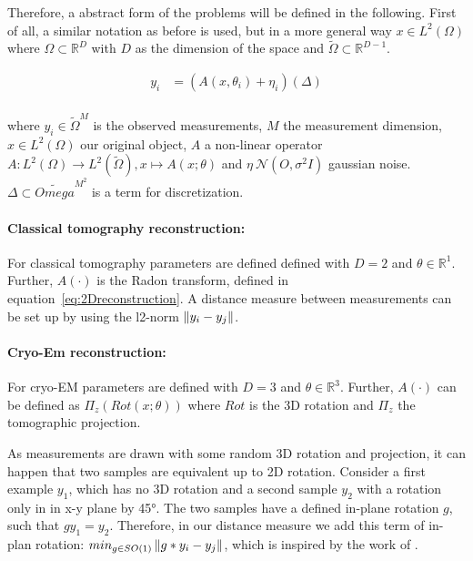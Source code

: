 Therefore, a abstract form of the problems will be defined in the following.
First of all, a similar notation as before is used, but in a more general way
$x \in L^2(\Omega)$ where $\Omega \subset \mathbb{R}^D$ with $D$ as the dimension of the space
and $\tilde{\Omega} \subset \mathbb{R}^{D-1}$.


\begin{equation}
    \begin{aligned}
        y_i &= \left( A(x, \theta_i) + \eta_i \right) (\Delta)\\
    \end{aligned}
\end{equation}

where $y_i \in \tilde{\Omega}^M$ is the observed measurements, $M$ the measurement dimension, $x \in L^2(\Omega)$ our original object, $A$ a non-linear operator 
$A: L^2(\Omega) \to L^2(\tilde{\Omega}), x \mapsto A(x; \theta)$ and
$\eta ~ \mathcal{N}(O, \sigma^2 I)$ gaussian noise. $\Delta \subset \tilde{Omega}^{M^2}$ is a term for discretization.

\paragraph{Classical tomography reconstruction:}

For classical tomography parameters are defined defined with $D=2$ and $\theta \in \mathbb{R}^1$.
Further, $A(\cdot)$ is the Radon transform, defined in equation~\ref{eq:2Dreconstruction}.
A distance measure between measurements can be set up by using the l2-norm $\left\lVert y_i - y_j\right\rVert$.

\paragraph{Cryo-Em reconstruction:}
For cryo-EM parameters are defined with $D=3$ and $\theta \in \mathbb{R}^3$.
Further, $A(\cdot)$ can be defined as $\Pi_z \left( Rot(x; \theta) \right)$ 
where $Rot$ is the 3D rotation and $\Pi_z$ the tomographic projection.

As measurements are drawn with some random 3D rotation and projection, it can happen that two samples are equivalent up to 2D rotation. 
Consider a first example $y_1$, which has no 3D rotation and 
a second sample $y_2$ with a rotation only in in x-y plane by 45°.
The two samples have a defined in-plane rotation $g$, such that $g y_1 = y_2$.
Therefore, in our distance measure we add this term of in-plan rotation: $min_{g \in SO(1)}\left\lVert g * y_i - y_j\right\rVert$, 
which is inspired by the work of \cite{multiDiffusionMaps}. 


